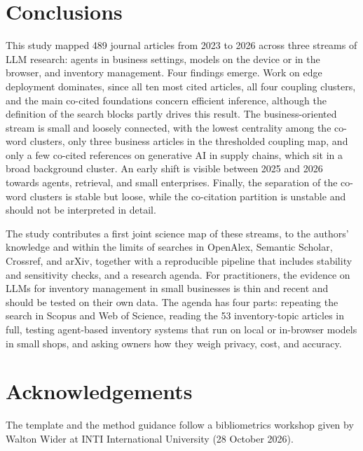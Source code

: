 \section{Conclusions}
This study mapped 489 journal articles from 2023 to 2026 across three streams of LLM research: agents in business settings, models on the device or in the browser, and inventory management. Four findings emerge. Work on edge deployment dominates, since all ten most cited articles, all four coupling clusters, and the main co-cited foundations concern efficient inference, although the definition of the search blocks partly drives this result. The business-oriented stream is small and loosely connected, with the lowest centrality among the co-word clusters, only three business articles in the thresholded coupling map, and only a few co-cited references on generative AI in supply chains, which sit in a broad background cluster. An early shift is visible between 2025 and 2026 towards agents, retrieval, and small enterprises. Finally, the separation of the co-word clusters is stable but loose, while the co-citation partition is unstable and should not be interpreted in detail.

The study contributes a first joint science map of these streams, to the authors' knowledge and within the limits of searches in OpenAlex, Semantic Scholar, Crossref, and arXiv, together with a reproducible pipeline that includes stability and sensitivity checks, and a research agenda. For practitioners, the evidence on LLMs for inventory management in small businesses is thin and recent and should be tested on their own data. The agenda has four parts: repeating the search in Scopus and Web of Science, reading the 53 inventory-topic articles in full, testing agent-based inventory systems that run on local or in-browser models in small shops, and asking owners how they weigh privacy, cost, and accuracy.

\section*{Acknowledgements}
The template and the method guidance follow a bibliometrics workshop given by Walton Wider at INTI International University (28 October 2026).

